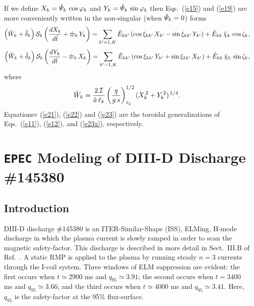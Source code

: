 \documentclass[12pt,prb,aps]{revtex4-1}
\begin{document}
If we define $X_k = \hat{\mit\Psi}_k\,\cos\varphi_k$ and $Y_k=\hat{\mit\Psi}_k\,\sin\varphi_k$ then Eqs.~(\ref{e15}) and (\ref{e19}) are
more conveniently written in the non-singular (when $\hat{\mit\Psi}_k=0$) forms
\begin{align}\label{e21}
\left(\hat{W}_k +\hat{\delta}_k\right){\cal S}_k\left(\frac{dX_k}{d\hat{t}} 
+\hat{\varpi}_k\,Y_k\right)= \sum_{k'=1,K}\hat{E}_{kk'}\,(\cos\xi_{kk'}\,X_{k'}  -\sin\xi_{kk'}\,Y_{k'}) + \hat{E}_{kk}\,\hat{\chi}_k\,\cos\zeta_k,\\[0.5ex]
\left(\hat{W}_k +\hat{\delta}_k\right){\cal S}_k\left(\frac{dY_k}{d\hat{t}} -\hat{\varpi}_k\,X_k\right)
= \sum_{k'=1,K}\hat{E}_{kk'}\,(\cos\xi_{kk'}\,Y_{k'}
+\sin\xi_{kk'}\,X_{k'}) + \hat{E}_{kk}\,\hat{\chi}_k\,\sin\zeta_k,\label{e22}
\end{align}
where
\begin{equation}\label{e23}
\hat{W}_k =\frac{2\,{\cal I}}{\hat{a}\,\hat{r}_k}\left(\frac{q}{g\,s}\right)^{1/2}_{\hat{r}_k} (X_k^{\,2} + Y_k^{\,2})^{\,1/4}.
\end{equation}
Equationsv (\ref{e21}), (\ref{e22}) and (\ref{e23}) are the toroidal generalizations of Eqs.~(\ref{e11}), (\ref{e12}), and (\ref{e23x}), respectively.

\section{{\tt EPEC} Modeling of DIII-D Discharge \#145380}\label{s4}
\subsection{Introduction}
DIII-D discharge \#145380 is an ITER-Similar-Shape (ISS), ELMing, H-mode discharge in which the
plasma current is slowly ramped in order to scan the magnetic safety-factor.\cite{d3d,d3d2} This discharge is described in more detail in Sect.~III.B of Ref.~.
A static RMP is applied to the plasma by running steady $n=3$ currents through the I-coil system.\cite{icoil}
Three windows of ELM suppression  are evident: the first occurs when $t\simeq 2900$ ms and $q_{95}\simeq 3.91$; the
second occurs when $t=3400$ ms and $q_{95}\simeq 3.66$; and the third occurs when $t\simeq 4000$ ms and $q_{95}\simeq 3.41$.  Here, $q_{95}$ is the safety-factor at the 95\% flux-surface. 
\end{document}
